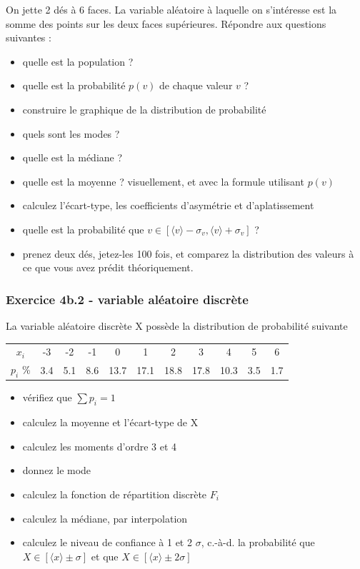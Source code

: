 \documentclass[main.tex]{subfiles}
\begin{document}
On jette 2 dés à 6 faces. La variable aléatoire à laquelle on s'intéresse est la somme des points sur les deux faces supérieures. Répondre aux questions suivantes :
\begin{itemize}
    \item quelle est la population ?
    \item quelle est la probabilité $p(v)$ de chaque valeur $v$ ?
    \item construire le graphique de la distribution de probabilité
    \item quels sont les modes ?
    \item quelle est la médiane ?
    \item quelle est la moyenne ? visuellement, et avec la formule utilisant $p(v)$
    \item calculez l'écart-type, les coefficients d'asymétrie et d'aplatissement
    \item quelle est la probabilité que $v\in[\langle v \rangle-\sigma_v,\langle v \rangle+\sigma_v]$ ?
    \item prenez deux dés, jetez-les 100 fois, et comparez la distribution des valeurs à ce que vous avez prédit théoriquement.
\end{itemize}

\subsubsection*{Exercice 4b.2 - variable aléatoire discrète}

La variable aléatoire discrète X possède la distribution de probabilité suivante
\begin{center}
    \begin{tabular}{c|cccccccccc}
        $x_i$    & -3  & -2  & -1  & 0    & 1    & 2    & 3    & 4    & 5   & 6   \\
        $p_i$ \% & 3.4 & 5.1 & 8.6 & 13.7 & 17.1 & 18.8 & 17.8 & 10.3 & 3.5 & 1.7
    \end{tabular}
\end{center}
\begin{itemize}
    \item vérifiez que $\sum p_i=1$
    \item calculez la moyenne et l'écart-type de X
    \item calculez les moments d'ordre 3 et 4
    \item donnez le mode
    \item calculez la fonction de répartition discrète $F_i$
    \item calculez la médiane, par interpolation
    \item calculez le niveau de confiance à 1 et 2 $\sigma$, c.-à-d. la probabilité que $X\in[\langle x\rangle\pm\sigma]$ et que $X\in[\langle x\rangle\pm2\sigma]$
\end{itemize}
\end{document}
